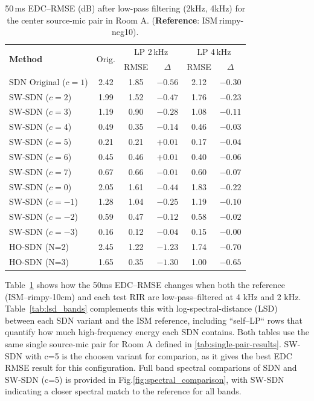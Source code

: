 \documentclass[journal]{IEEEtran}
\begin{document}
\begin{table}[t]
    \centering
    \caption{50\,ms EDC–RMSE (dB) after low-pass filtering (2kHz, 4kHz) for the center source-mic pair in Room A.
             (\textbf{Reference}: ISM\,rimpy-neg10).}
    \label{tab:lp-edc-rmse}
    \renewcommand{\arraystretch}{1.1}
    \begin{tabular}{lccccc}
        \toprule
        \multirow{2}{*}{\textbf{Method}} &
        \multirow{2}{*}{Orig.} &
        \multicolumn{2}{c}{LP 2\,kHz} &
        \multicolumn{2}{c}{LP 4\,kHz} \\
        & & RMSE & $\!\Delta$ & RMSE & $\!\Delta$ \\
        \midrule
        SDN Original ($c=1$) & 2.42 & 1.85 & $-0.56$ & 2.12 & $-0.30$ \\
        SW-SDN ($c=2$)     & 1.99 & 1.52 & $-0.47$ & 1.76 & $-0.23$ \\
        SW-SDN ($c=3$)     & 1.19 & 0.90 & $-0.28$ & 1.08 & $-0.11$ \\
        SW-SDN ($c=4$)     & 0.49 & 0.35 & $-0.14$ & 0.46 & $-0.03$ \\
        SW-SDN ($c=5$)     & 0.21 & 0.21 & $+0.01$ & 0.17 & $-0.04$ \\
        SW-SDN ($c=6$)     & 0.45 & 0.46 & $+0.01$ & 0.40 & $-0.06$ \\
        SW-SDN ($c=7$)     & 0.67 & 0.66 & $-0.01$ & 0.60 & $-0.07$ \\
        SW-SDN ($c=0$)     & 2.05 & 1.61 & $-0.44$ & 1.83 & $-0.22$ \\
        SW-SDN ($c=-1$)    & 1.28 & 1.04 & $-0.25$ & 1.19 & $-0.10$ \\
        SW-SDN ($c=-2$)    & 0.59 & 0.47 & $-0.12$ & 0.58 & $-0.02$ \\
        SW-SDN ($c=-3$)    & 0.16 & 0.12 & $-0.04$ & 0.15 & $-0.00$ \\
        HO-SDN (N=2)       & 2.45 & 1.22 & $-1.23$ & 1.74 & $-0.70$ \\
        HO-SDN (N=3)       & 1.65 & 0.35 & $-1.30$ & 1.00 & $-0.65$ \\
        \bottomrule
    \end{tabular}
\end{table}

Table~\ref{tab:lp-edc-rmse} shows how the 50ms EDC–RMSE changes
when both the reference (ISM–rimpy-10cm) and
each test RIR are low-pass–filtered at 4 kHz and 2 kHz.  
Table~\ref{tab:lsd_bands} complements this with
log-spectral-distance (LSD) between each SDN variant and the ISM reference, including
“self–LP“ rows that quantify how much high-frequency energy each SDN
contains. Both tables use the same single source-mic pair for Room A defined in \ref{tab:single-pair-results}. 
SW-SDN with c=5 is the choosen variant for comparion, as it gives the best EDC RMSE result for this configuration.
Full band spectral comparions of SDN and SW-SDN (c=5) is provided in Fig.\ref{fig:spectral_comparison}, 
with SW-SDN indicating a closer spectral match to the reference for all bands. 
\end{document}
